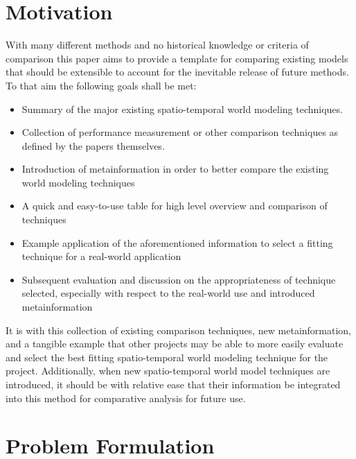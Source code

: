   \section{ Motivation }
  With many different methods and no historical knowledge or criteria of comparison
  this paper aims to provide a template for comparing existing models that should
  be extensible to account for the inevitable release of future methods. To that
  aim the following goals shall be met:

  \begin{itemize}
    \item Summary of the major existing spatio-temporal world modeling techniques.

    \item Collection of performance measurement or other comparison techniques as
      defined by the papers themselves.

    \item Introduction of metainformation in order to better compare the existing
      world modeling techniques

    \item A quick and easy-to-use table for high level overview and comparison of techniques

    \item Example application of the aforementioned information to select a fitting
      technique for a real-world application

    \item Subsequent evaluation and discussion on the appropriateness of technique
      selected, especially with respect to the real-world use and introduced metainformation

  \end{itemize}

  It is with this collection of existing comparison techniques, new metainformation,
  and a tangible example that other projects may be able to more easily evaluate
  and select the best fitting spatio-temporal world modeling technique for the
  project. Additionally, when new spatio-temporal world model techniques are
  introduced, it should be with relative ease that their information be integrated
  into this method for comparative analysis for future use. \\



  \section{ Problem Formulation }

